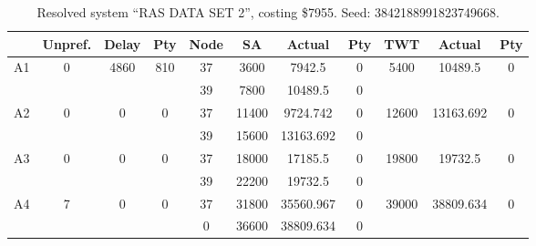 \begin{sidewaystable}
\footnotesize
\caption{Resolved system ``RAS DATA SET 2'', costing \$7955. Seed: 3842188991823749668.}
\centering
\begin{tabular}{c||c|c|c||c|c|c|c||c|c|c}
  \hline \hline
  &
  Unpref. & 
  Delay &
  Pty &
  Node &
  SA &
  Actual &
  Pty &
  TWT &
  Actual &
  Pty \\
      \hline
      \multirow{2}{*}{A1} &
      \multirow{2}{*}{0} &
      \multirow{2}{*}{4860} &
      \multirow{2}{*}{810} &
      37 &
      3600 &
        7942.5 &
        0 &
      \multirow{2}{*}{5400} &
        \multirow{2}{*}{10489.5} &
        \multirow{2}{*}{0}
      \\
      \cline{5-8}
       &
       &
       &
       &
      39 &
      7800 &
        10489.5 &
        0 &
      
         &
        
      \\
      \hline
      \multirow{2}{*}{A2} &
      \multirow{2}{*}{0} &
      \multirow{2}{*}{0} &
      \multirow{2}{*}{0} &
      37 &
      11400 &
        9724.742 &
        0 &
      \multirow{2}{*}{12600} &
        \multirow{2}{*}{13163.692} &
        \multirow{2}{*}{0}
      \\
      \cline{5-8}
       &
       &
       &
       &
      39 &
      15600 &
        13163.692 &
        0 &
      
         &
        
      \\
      \hline
      \multirow{2}{*}{A3} &
      \multirow{2}{*}{0} &
      \multirow{2}{*}{0} &
      \multirow{2}{*}{0} &
      37 &
      18000 &
        17185.5 &
        0 &
      \multirow{2}{*}{19800} &
        \multirow{2}{*}{19732.5} &
        \multirow{2}{*}{0}
      \\
      \cline{5-8}
       &
       &
       &
       &
      39 &
      22200 &
        19732.5 &
        0 &
      
         &
        
      \\
      \hline
      \multirow{2}{*}{A4} &
      \multirow{2}{*}{7} &
      \multirow{2}{*}{0} &
      \multirow{2}{*}{0} &
      37 &
      31800 &
        35560.967 &
        0 &
      \multirow{2}{*}{39000} &
        \multirow{2}{*}{38809.634} &
        \multirow{2}{*}{0}
      \\
      \cline{5-8}
       &
       &
       &
       &
      0 &
      36600 &
        38809.634 &
        0 &
      

\end{tabular}
\end{sidewaystable}
